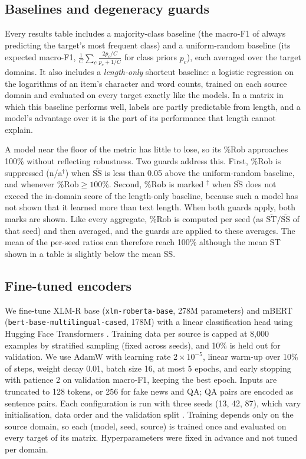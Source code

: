 \documentclass[acmsmall,screen]{acmart}
\begin{document}
\subsection{Baselines and degeneracy guards}\label{sec:guard}
Every results table includes a majority-class baseline (the macro-F1 of always predicting the target's most frequent class) and a uniform-random baseline (its expected macro-F1, $\frac{1}{C}\sum_c \frac{2p_c/C}{p_c+1/C}$ for class priors $p_c$), each averaged over the target domains. It also includes a \emph{length-only} shortcut baseline: a logistic regression on the logarithms of an item's character and word counts, trained on each source domain and evaluated on every target exactly like the models. In a matrix in which this baseline performs well, labels are partly predictable from length, and a model's advantage over it is the part of its performance that length cannot explain.

A model near the floor of the metric has little to lose, so its $\%\text{Rob}$ approaches 100\% without reflecting robustness. Two guards address this. First, $\%\text{Rob}$ is suppressed (n/a$^\dagger$) when $\overline{\text{SS}}$ is less than 0.05 above the uniform-random baseline, and whenever $\%\text{Rob}\geq 100\%$. Second, $\%\text{Rob}$ is marked $^\ddagger$ when $\overline{\text{SS}}$ does not exceed the in-domain score of the length-only baseline, because such a model has not shown that it learned more than text length. When both guards apply, both marks are shown. Like every aggregate, $\%\text{Rob}$ is computed per seed (as $\overline{\text{ST}}/\overline{\text{SS}}$ of that seed) and then averaged, and the guards are applied to these averages. The mean of the per-seed ratios can therefore reach 100\% although the mean ST shown in a table is slightly below the mean SS.

\subsection{Fine-tuned encoders}\label{sec:ft}
We fine-tune XLM-R base (\nolinkurl{xlm-roberta-base}, 278M parameters) \citep{conneau2020xlmr} and mBERT (\nolinkurl{bert-base-multilingual-cased}, 178M) \citep{devlin2019bert} with a linear classification head using Hugging Face Transformers \citep{wolf2020transformers}. Training data per source is capped at 8{,}000 examples by stratified sampling (fixed across seeds), and 10\% is held out for validation. We use AdamW with learning rate $2\times10^{-5}$, linear warm-up over 10\% of steps, weight decay 0.01, batch size 16, at most 5 epochs, and early stopping with patience 2 on validation macro-F1, keeping the best epoch. Inputs are truncated to 128 tokens, or 256 for fake news and QA; QA pairs are encoded as sentence pairs. Each configuration is run with three seeds (13, 42, 87), which vary initialisation, data order and the validation split \citep{dodge2020finetuning,mosbach2021stability}. Training depends only on the source domain, so each (model, seed, source) is trained once and evaluated on every target of its matrix. Hyperparameters were fixed in advance and not tuned per domain.
\end{document}
